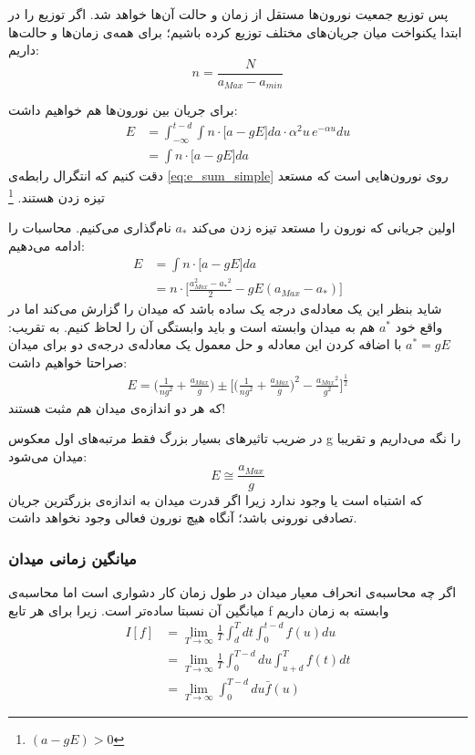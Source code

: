 \documentclass[12pt,onecolumn,a4paper]{article}
\begin{document}
پس توزیع جمعیت نورون‌‌ها مستقل از زمان و حالت آن‌ها خواهد شد. اگر توزیع را در ابتدا یکنواخت میان جریان‌های مختلف توزیع کرده باشیم؛ برای همه‌ی زمان‌ها و حالت‌ها داریم:
\begin{equation}
n = \frac{N}{a_{Max} - a_{min} }
\end{equation}


برای جریان بین نورون‌ها هم خواهیم داشت:
\begin{align}
E &= \int_{- \infty}^{t - d} \int n \cdot \big[ a - g E \big] da \cdot \alpha^2 u\, e^{-\alpha u} du\\
&=  \int n \cdot \big[ a - g E \big] da \label{eq:e_sum_simple}
\end{align}
دقت کنیم که انتگرال رابطه‌ی \ref{eq:e_sum_simple} روی  نورون‌هایی است که مستعد تیزه زدن هستند.
\footnote{
$(a - g E) > 0 $
}

اولین جریانی که نورون را مستعد تیزه زدن می‌کند $a_*$ نام‌گذاری می‌کنیم. محاسبات را ادامه می‌دهیم:
\begin{align}
E &=  \int n \cdot \big[ a - g E \big] da \\
&= n \cdot \big[ \frac{a^2_{Max} - {a_*}^2}{2} - g E (a_{Max} - a_*) \big]
\end{align}
شاید بنظر این یک معادله‌ی درجه یک ساده باشد که میدان را گزارش می‌کند اما در واقع خود $a^*$ هم به میدان وابسته است و باید وابستگی آن را لحاظ کنیم. به تقریب:
$a^{*} = gE$
با اضافه کردن این معادله و حل معمول یک معادله‌ی درجه‌ی دو برای میدان صراحتا خواهیم داشت:
\begin{align}
E =  \big( \frac{1}{n g^2} + \frac{a_{Max}}{g} \big) \pm \big[ \big( \frac{1}{n g^2} + \frac{a_{Max}}{g} \big)^2 - \frac{{a_{Max}}^2}{g^2} \big]^{\frac{1}{2}}
\end{align}
که هر دو اندازه‌ی میدان هم مثبت هستند!

در ضریب تاثیرهای بسیار بزرگ فقط مرتبه‌های اول معکوس g را نگه می‌داریم و تقریبا میدان می‌شود:
\begin{equation}
E \cong \frac{a_{Max}}{g}
\end{equation}
که اشتباه است یا وجود ندارد زیرا اگر قدرت میدان به اندازه‌ی بزرگترین جریان تصادفی نورونی باشد؛ آنگاه هیچ نورون فعالی وجود نخواهد داشت.
\subsubsection{میانگین زمانی میدان}
اگر چه محاسبه‌ی انحراف معیار میدان در طول زمان کار دشواری است اما محاسبه‌ی میانگین آن نسبتا ساده‌تر است. زیرا برای هر تابع f وابسته به زمان داریم
\begin{align}
I[f] &= \lim_{T\to\infty} \frac{1}{T} \int^{T}_{d} dt \int_{0}^{t - d} f(u)du \\
&= \lim_{T\to\infty} \frac{1}{T} \int_{0}^{T - d} du \int^{T}_{u+d} f(t) dt \\
&= \lim_{T\to\infty} \int_{0}^{T - d} du \bar{f}(u)  
\end{align}

\newpage


\end{document}
